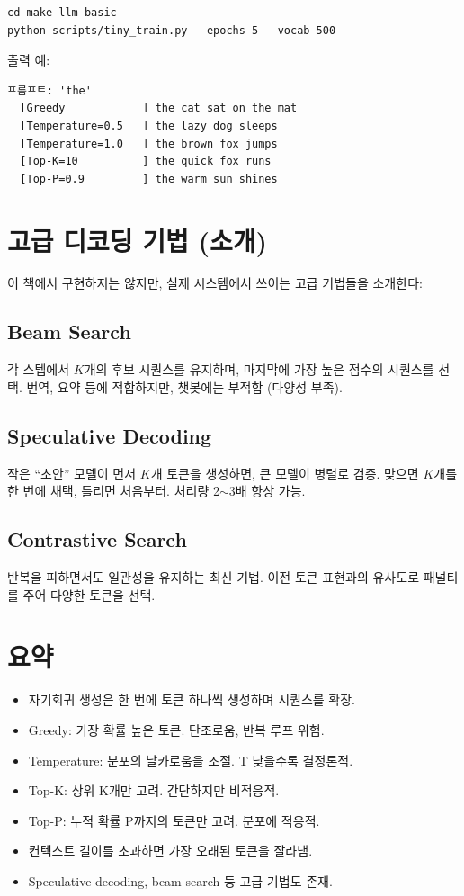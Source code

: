 \begin{lstlisting}[style=bashstyle]
cd make-llm-basic
python scripts/tiny_train.py --epochs 5 --vocab 500
\end{lstlisting}

출력 예:
\begin{lstlisting}[basicstyle=\ttfamily\footnotesize, backgroundcolor=\color{codebg}, frame=single]
프롬프트: 'the'
  [Greedy            ] the cat sat on the mat
  [Temperature=0.5   ] the lazy dog sleeps
  [Temperature=1.0   ] the brown fox jumps
  [Top-K=10          ] the quick fox runs
  [Top-P=0.9         ] the warm sun shines
\end{lstlisting}

\section{고급 디코딩 기법 (소개)}

이 책에서 구현하지는 않지만, 실제 시스템에서 쓰이는 고급 기법들을 소개한다:

\subsection{Beam Search}
각 스텝에서 $K$개의 후보 시퀀스를 유지하며, 마지막에 가장 높은 점수의 시퀀스를 선택. 번역, 요약 등에 적합하지만, 챗봇에는 부적합 (다양성 부족).

\subsection{Speculative Decoding}
작은 ``초안'' 모델이 먼저 $K$개 토큰을 생성하면, 큰 모델이 병렬로 검증. 맞으면 $K$개를 한 번에 채택, 틀리면 처음부터. 처리량 2$\sim$3배 향상 가능.

\subsection{Contrastive Search}
반복을 피하면서도 일관성을 유지하는 최신 기법. 이전 토큰 표현과의 유사도로 패널티를 주어 다양한 토큰을 선택.

\section{요약}

\begin{itemize}
  \item 자기회귀 생성은 한 번에 토큰 하나씩 생성하며 시퀀스를 확장.
  \item Greedy: 가장 확률 높은 토큰. 단조로움, 반복 루프 위험.
  \item Temperature: 분포의 날카로움을 조절. T 낮을수록 결정론적.
  \item Top-K: 상위 K개만 고려. 간단하지만 비적응적.
  \item Top-P: 누적 확률 P까지의 토큰만 고려. 분포에 적응적.
  \item 컨텍스트 길이를 초과하면 가장 오래된 토큰을 잘라냄.
  \item Speculative decoding, beam search 등 고급 기법도 존재.
\end{itemize}

